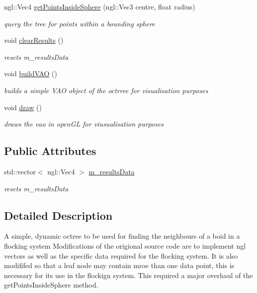 \begin{DoxyCompactItemize}
ngl::Vec4 \hyperlink{classOctree_a814ed4196b414829c44f55c8b65a7517}{getPointsInsideSphere} (ngl::Vec3 centre, float radius)
\begin{DoxyCompactList}\small\item\em query the tree for points within a bounding sphere \item\end{DoxyCompactList}\item 
void \hyperlink{classOctree_aca0adcb1047b4ced99f1e3449ac88036}{clearResults} ()
\begin{DoxyCompactList}\small\item\em resets m\_\-resultsData \item\end{DoxyCompactList}\item 
void \hyperlink{classOctree_a6ac1e8420a5b02c854e8ebcf8e18a401}{buildVAO} ()
\begin{DoxyCompactList}\small\item\em builds a simple VAO object of the octrree for visualisation purposes \item\end{DoxyCompactList}\item 
void \hyperlink{classOctree_ab49e14a7f8dd7c2f87c16098d5c602a3}{draw} ()
\begin{DoxyCompactList}\small\item\em draws the vao in openGL for viusualisation purposes \item\end{DoxyCompactList}\end{DoxyCompactItemize}
\subsection*{Public Attributes}
\begin{DoxyCompactItemize}
\item 
std::vector$<$ ngl::Vec4 $>$ \hyperlink{classOctree_a6260225ce5323751e8053cfd4597f2cd}{m\_\-resultsData}
\begin{DoxyCompactList}\small\item\em resets m\_\-resultsData \item\end{DoxyCompactList}\end{DoxyCompactItemize}


\subsection{Detailed Description}
A simple, dynamic octree to be used for finding the neighbours of a boid in a flocking system Modifications of the origional source code are to implement ngl vectors as well as the specific data required for the flocking system. It is also modififed so that a leaf node may contain mroe than one data point, this is necessary for its use in the flockign system. This required a major overhaul of the getPointsInsideSphere method. 

